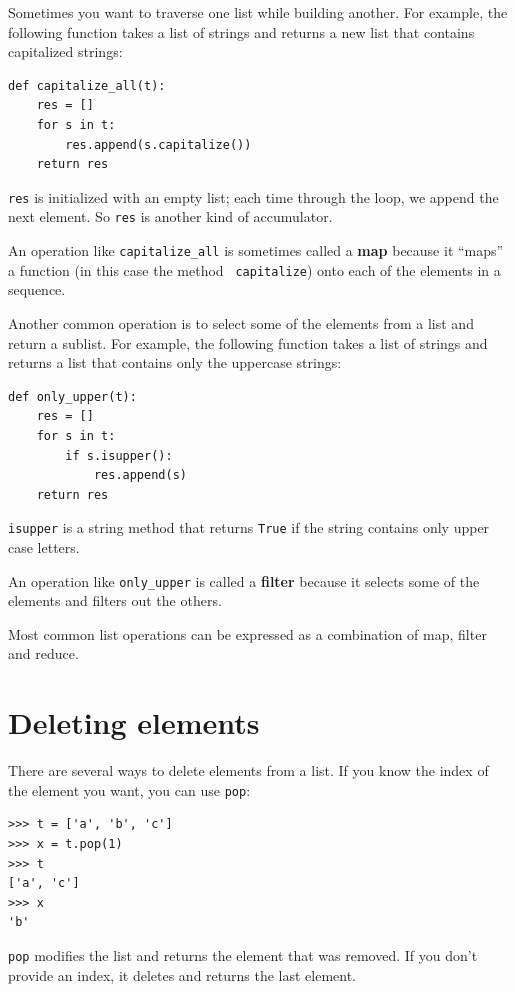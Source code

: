 \documentclass[10pt]{book}
\begin{document}
Sometimes you want to traverse one list while building
another.  For example, the following function takes a list of strings
and returns a new list that contains capitalized strings:

\begin{verbatim}
def capitalize_all(t):
    res = []
    for s in t:
        res.append(s.capitalize())
    return res
\end{verbatim}
%
{\tt res} is initialized with an empty list; each time through
the loop, we append the next element.  So {\tt res} is another
kind of accumulator.

An operation like \verb"capitalize_all" is sometimes called a {\bf
map} because it ``maps'' a function (in this case the method {\tt
capitalize}) onto each of the elements in a sequence.

Another common operation is to select some of the elements from
a list and return a sublist.  For example, the following
function takes a list of strings and returns a list that contains
only the uppercase strings:

\begin{verbatim}
def only_upper(t):
    res = []
    for s in t:
        if s.isupper():
            res.append(s)
    return res
\end{verbatim}
%
{\tt isupper} is a string method that returns {\tt True} if
the string contains only upper case letters.

An operation like \verb"only_upper" is called a {\bf filter} because
it selects some of the elements and filters out the others.

Most common list operations can be expressed as a combination
of map, filter and reduce.


\section{Deleting elements}

There are several ways to delete elements from a list.  If you
know the index of the element you want, you can use
{\tt pop}:

\begin{verbatim}
>>> t = ['a', 'b', 'c']
>>> x = t.pop(1)
>>> t
['a', 'c']
>>> x
'b'
\end{verbatim}
%
{\tt pop} modifies the list and returns the element that was removed.
If you don't provide an index, it deletes and returns the
last element.
\end{document}
